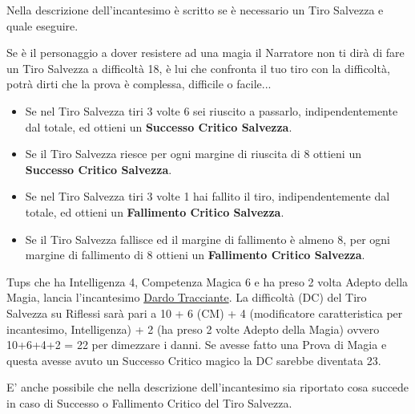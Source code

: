 \begin{multicols}{2}
Nella descrizione dell'incantesimo è scritto se è necessario un Tiro Salvezza e quale eseguire.

Se è il personaggio a dover resistere ad una magia il Narratore non ti dirà di fare un Tiro Salvezza a difficoltà 18, è lui che confronta il tuo tiro con la difficoltà, potrà dirti che la prova è complessa, difficile o facile...

\begin{itemize}[leftmargin=*] \setlength{\itemsep}{0pt}

\item
Se nel Tiro Salvezza tiri 3 volte 6 sei riuscito a passarlo, indipendentemente dal totale, ed ottieni un \textbf{Successo Critico Salvezza}.

\item
Se il Tiro Salvezza riesce per ogni margine di riuscita di 8 ottieni un \textbf{Successo Critico Salvezza}.

\item
Se nel Tiro Salvezza tiri 3 volte 1 hai fallito il tiro, indipendentemente dal totale, ed ottieni un \textbf{Fallimento Critico Salvezza}.

\item
Se il Tiro Salvezza fallisce ed il margine di fallimento è almeno 8, per ogni margine di fallimento di 8 ottieni un \textbf{Fallimento Critico Salvezza}.

\end{itemize}

\begin{changemargin}{0.3cm}{0.3cm}\begin{tcolorbox}[title = Tups lancia Dardo Tracciante!]
Tups che ha Intelligenza 4, Competenza Magica 6 e ha preso 2 volta Adepto della Magia, lancia l'incantesimo \hyperlink{Dardo Tracciante}{Dardo Tracciante}. La difficoltà (DC) del Tiro Salvezza su Riflessi sarà pari a 10 + 6 (CM) + 4 (modificatore caratteristica per incantesimo, Intelligenza) + 2 (ha preso 2 volte Adepto della Magia) ovvero 10+6+4+2 = 22 per dimezzare i danni. Se avesse fatto una Prova di Magia e questa avesse avuto un Successo Critico magico la DC sarebbe diventata 23.
\end{tcolorbox}\end{changemargin}

E' anche possibile che nella descrizione dell'incantesimo sia riportato cosa succede in caso di Successo o Fallimento Critico del Tiro Salvezza.


\end{multicols}
